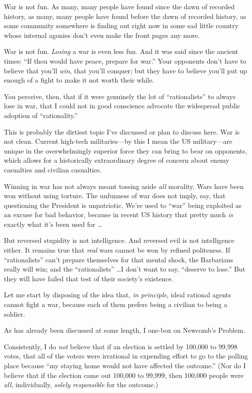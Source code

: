 {
 War is not fun. As many, many people have found since the dawn of
recorded history, as many, many people have found before the dawn of
recorded history, as some community somewhere is finding out right now
in some sad little country whose internal agonies don't
even make the front pages any more.}

{
 War is not fun. \textit{Losing} a war is even less fun. And it was
said since the ancient times: ``If thou would have
peace, prepare for war.'' Your opponents
don't have to believe that you'll
\textit{win}, that you'll conquer; but they have to
believe you'll put up enough of a fight to make it not
worth their while.}

{
 You perceive, then, that if it were genuinely the lot of
``rationalists'' to always lose in
war, that I could not in good conscience advocate the widespread public
adoption of ``rationality.''}

{
 This is probably the dirtiest topic I've discussed
or plan to discuss here. War is not clean. Current high-tech
militaries---by this I mean the US military---are unique in the
overwhelmingly superior force they can bring to bear on opponents,
which allows for a historically extraordinary degree of concern about
enemy casualties and civilian casualties.}

{
 Winning in war has not always meant tossing aside \textit{all}
morality. Wars have been won without using torture. The unfunness of
war does not imply, say, that questioning the President is unpatriotic.
We're used to
``war'' being exploited as an excuse
for bad behavior, because in recent US history that pretty much
\textit{is} exactly what it's been used for \ldots}

{
 But reversed stupidity is not intelligence. And reversed evil is
not intelligence either. It remains true that \textit{real} wars cannot
be won by refined politeness. If
``rationalists''
can't prepare themselves for that mental shock, the
Barbarians really will win; and the
``rationalists'' \ldots I
don't want to say, ``deserve to
lose.'' But they will have failed that test of their
society's existence.}

{
 Let me start by disposing of the idea that, \textit{in principle},
ideal rational agents cannot fight a war, because each of them prefers
being a civilian to being a soldier.}

{
 As has already been discussed at some length, I one-box on
Newcomb's Problem.}

{
 Consistently, I do \textit{not} believe that if an election is
settled by 100,000 to 99,998 votes, that all of the voters were
irrational in expending effort to go to the polling place because
``my staying home would not have affected the
outcome.'' (Nor do I believe that if the election
came out 100,000 to 99,999, then 100,000 people were \textit{all},
individually, \textit{solely responsible} for the outcome.)}

